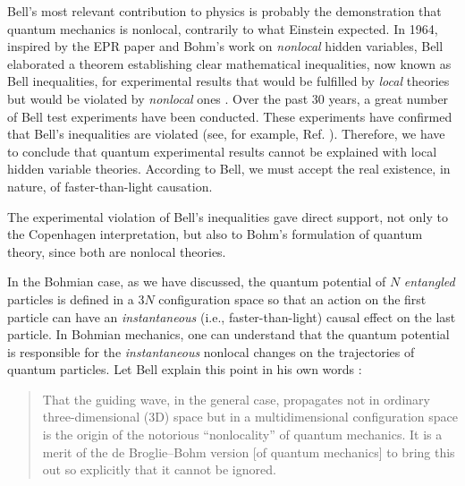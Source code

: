\documentclass[onecolumn,nofootinbib, secnumarabic, amsmath, nobibnotes,11pt,aps,pra]{revtex4-1}
\begin{document}
Bell's most relevant contribution to physics is probably the
demonstration that quantum mechanics is nonlocal, contrarily to what
Einstein expected. In 1964, inspired by the EPR paper
\cite{om.Einstein_rosen1935} and Bohm's work on \textit{nonlocal}
hidden variables, Bell elaborated a theorem establishing clear
mathematical inequalities, now known as Bell inequalities, for
experimental results that would be fulfilled by \textit{local}
theories but would be violated by \textit{nonlocal} ones
\cite{om.Bell1964}. Over the past 30 years, a great number of Bell
test experiments have been conducted. These experiments have
confirmed that Bell's inequalities are violated (see, for example,
Ref. \cite{om.aspect1982}). Therefore, we have to conclude that
quantum experimental results cannot be explained with local hidden
variable theories. According to Bell, we must accept the real
existence, in nature, of faster-than-light causation.

The experimental violation of Bell's inequalities gave direct support, not only to the Copenhagen interpretation, but also to Bohm's formulation of quantum theory, since both are nonlocal theories.

In the Bohmian case, as we have discussed, the quantum potential of $N$ \textit{entangled} particles is defined in a $3N$ configuration space so that an action on the first particle can have an \textit{instantaneous} (i.e., faster-than-light) causal effect on the last particle. In Bohmian mechanics, one can understand that the quantum potential is responsible for the \textit{instantaneous} nonlocal changes on the trajectories of quantum particles.
Let Bell explain this point in his own words \cite{om.Bell1987}:\vspace*{-6pt}\\
\begin{quote}
That the guiding wave, in the general case, propagates not in
ordinary three-dimensional (3D) space but in a multidimensional
configuration space is the origin of the notorious ``nonlocality''
of quantum mechanics. It is a merit of the de Broglie--Bohm version
[of quantum mechanics] to bring this out so explicitly that it
cannot be ignored.\vspace*{-6pt}\\
\end{quote}
\end{document}
